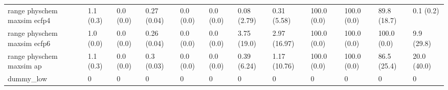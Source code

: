 \begin{tabular}{llllllllllll}
range physchem maxsim ecfp4 & {\cellcolor[HTML]{F6FCFD}} \color[HTML]{000000} 1.1 (0.3) & {\cellcolor[HTML]{F7FCFD}} \color[HTML]{000000} 0.0 (0.0) & {\cellcolor[HTML]{C4E9E1}} \color[HTML]{000000} 0.27 (0.04) & {\cellcolor[HTML]{F7FCFD}} \color[HTML]{000000} 0.0 (0.0) & {\cellcolor[HTML]{F7FCFD}} \color[HTML]{000000} 0.0 (0.0) & {\cellcolor[HTML]{F7FCFD}} \color[HTML]{000000} 0.08 (2.79) & {\cellcolor[HTML]{F7FCFD}} \color[HTML]{000000} 0.31 (5.58) & {\cellcolor[HTML]{00441B}} \color[HTML]{F1F1F1} 100.0 (0.0) & {\cellcolor[HTML]{00441B}} \color[HTML]{F1F1F1} 100.0 (0.0) & {\cellcolor[HTML]{006428}} \color[HTML]{F1F1F1} 89.8 (18.7) & {\cellcolor[HTML]{F7FCFD}} \color[HTML]{000000} 0.1 (0.2) \\
range physchem maxsim ecfp6 & {\cellcolor[HTML]{F6FCFD}} \color[HTML]{000000} 1.0 (0.0) & {\cellcolor[HTML]{F7FCFD}} \color[HTML]{000000} 0.0 (0.0) & {\cellcolor[HTML]{C7EAE3}} \color[HTML]{000000} 0.26 (0.04) & {\cellcolor[HTML]{F7FCFD}} \color[HTML]{000000} 0.0 (0.0) & {\cellcolor[HTML]{F7FCFD}} \color[HTML]{000000} 0.0 (0.0) & {\cellcolor[HTML]{F2FAFC}} \color[HTML]{000000} 3.75 (19.0) & {\cellcolor[HTML]{F3FAFC}} \color[HTML]{000000} 2.97 (16.97) & {\cellcolor[HTML]{00441B}} \color[HTML]{F1F1F1} 100.0 (0.0) & {\cellcolor[HTML]{00441B}} \color[HTML]{F1F1F1} 100.0 (0.0) & {\cellcolor[HTML]{00441B}} \color[HTML]{F1F1F1} 100.0 (0.0) & {\cellcolor[HTML]{E9F7FA}} \color[HTML]{000000} 9.9 (29.8) \\
range physchem maxsim ap & {\cellcolor[HTML]{F5FBFD}} \color[HTML]{000000} 1.1 (0.3) & {\cellcolor[HTML]{F7FCFD}} \color[HTML]{000000} 0.0 (0.0) & {\cellcolor[HTML]{B7E4DA}} \color[HTML]{000000} 0.3 (0.03) & {\cellcolor[HTML]{F7FCFD}} \color[HTML]{000000} 0.0 (0.0) & {\cellcolor[HTML]{F7FCFD}} \color[HTML]{000000} 0.0 (0.0) & {\cellcolor[HTML]{F6FCFD}} \color[HTML]{000000} 0.39 (6.24) & {\cellcolor[HTML]{F5FBFD}} \color[HTML]{000000} 1.17 (10.76) & {\cellcolor[HTML]{00441B}} \color[HTML]{F1F1F1} 100.0 (0.0) & {\cellcolor[HTML]{00441B}} \color[HTML]{F1F1F1} 100.0 (0.0) & {\cellcolor[HTML]{026F2E}} \color[HTML]{F1F1F1} 86.5 (25.4) & {\cellcolor[HTML]{D6F0EE}} \color[HTML]{000000} 20.0 (40.0) \\
dummy_low & {\cellcolor[HTML]{F7FCFD}} \color[HTML]{000000} 0 & {\cellcolor[HTML]{F7FCFD}} \color[HTML]{000000} 0 & {\cellcolor[HTML]{F7FCFD}} \color[HTML]{000000} 0 & {\cellcolor[HTML]{F7FCFD}} \color[HTML]{000000} 0 & {\cellcolor[HTML]{F7FCFD}} \color[HTML]{000000} 0 & {\cellcolor[HTML]{F7FCFD}} \color[HTML]{000000} 0 & {\cellcolor[HTML]{F7FCFD}} \color[HTML]{000000} 0 & {\cellcolor[HTML]{F7FCFD}} \color[HTML]{000000} 0 & {\cellcolor[HTML]{F7FCFD}} \color[HTML]{000000} 0 & {\cellcolor[HTML]{F7FCFD}} \color[HTML]{000000} 0 & {\cellcolor[HTML]{F7FCFD}} \color[HTML]{000000} 0 \\

\end{tabular}
